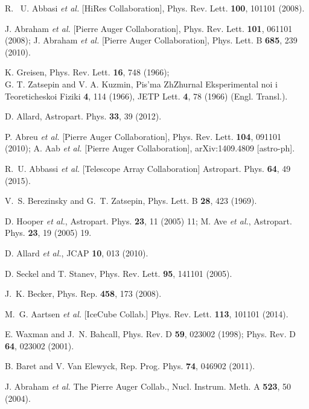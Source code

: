 \documentclass[reprint,showpacs,showkeys,amsmath,amssymb,aps,nofootinbib]{revtex4-1}
\begin{document}
\begin{thebibliography}{99}

R.~ U. Abbasi {\it et al.} [HiRes Collaboration], 
Phys. Rev. Lett. \textbf{100}, 101101 (2008).

J. Abraham {\it et al.} [Pierre Auger Collaboration], 
Phys. Rev. Lett. \textbf{101}, 061101 (2008);
J. Abraham {\it et al.} [Pierre Auger Collaboration], 
Phys. Lett. B {\bf 685}, 239 (2010).

K. Greisen, Phys. Rev. Lett. {\bf 16}, 748 (1966); \\
G. T. Zatsepin and V. A. Kuzmin, Pis'ma ZhZhurnal Eksperimental 
noi i Teoreticheskoi Fiziki {\bf 4}, 114 (1966),
JETP Lett. {\bf 4}, 78 (1966) (Engl. Transl.).

D. Allard, Astropart. Phys. {\bf 33}, 39 (2012).

P. Abreu {\it et al.} [Pierre Auger Collaboration],
Phys. Rev. Lett. {\bf 104}, 091101 (2010);
A. Aab {\it et al.} [Pierre Auger Collaboration],
arXiv:1409.4809 [astro-ph].

R.~U. Abbassi {\it et al.} [Telescope Array Collaboration] 
Astropart. Phys. {\bf 64}, 49 (2015).

V.~S. Berezinsky and G.~T. Zatsepin, Phys. Lett. B {\bf 28}, 423 (1969).

D. Hooper {\it et al.},
Astropart.  Phys. {\bf 23}, 11 (2005) 11;
M. Ave {\it et al.}, 
Astropart.  Phys. {\bf 23}, 19 (2005) 19.

D. Allard {\it et al.}, 
JCAP {\bf 10}, 013 (2010).

D. Seckel and T. Stanev,
Phys. Rev. Lett. {\bf 95}, 141101 (2005).

J.~K. Becker, Phys. Rep. {\bf 458}, 173 (2008).

M.~G. Aartsen {\it et al.} [IceCube Collab.]
Phys. Rev. Lett. {\bf 113}, 101101 (2014).

E. Waxman and J.~N. Bahcall,
Phys. Rev. D {\bf 59}, 023002 (1998);
Phys. Rev. D {\bf 64}, 023002 (2001).

B. Baret and V. Van Elewyck,
Rep. Prog. Phys. {\bf 74}, 046902 (2011).

J. Abraham {\it et al.}
The Pierre Auger Collab., 
Nucl. Instrum. Meth. A {\bf 523}, 50 (2004).


\end{thebibliography}
\end{document}
